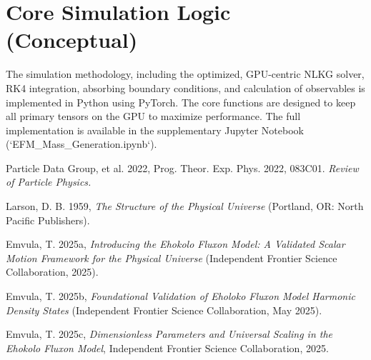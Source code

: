 \documentclass[11pt]{article}
\begin{document}
\appendix
\section{Core Simulation Logic (Conceptual)}
\label{app:code_mass_gen_final}
The simulation methodology, including the optimized, GPU-centric NLKG solver, RK4 integration, absorbing boundary conditions, and calculation of observables is implemented in Python using PyTorch. The core functions are designed to keep all primary tensors on the GPU to maximize performance. The full implementation is available in the supplementary Jupyter Notebook (`EFM_Mass_Generation.ipynb`).

 
\begin{thebibliography}{99}
\raggedright
{}
Particle Data Group, et al. 2022, Prog. Theor. Exp. Phys. 2022, 083C01. 
\textit{Review of Particle Physics.}

Larson, D. B. 1959, \textit{The Structure of the Physical Universe} (Portland, OR: North Pacific Publishers).

Emvula, T. 2025a, \textit{Introducing the Ehokolo Fluxon Model: A Validated Scalar Motion Framework for the Physical Universe} (Independent Frontier Science Collaboration, 2025). 

Emvula, T. 2025b, \textit{Foundational Validation of Eholoko Fluxon Model Harmonic Density States} (Independent Frontier Science Collaboration, May 2025).

Emvula, T. 2025c, \textit{Dimensionless Parameters and Universal Scaling in the Ehokolo Fluxon Model}, Independent Frontier Science Collaboration, 2025.

\end{thebibliography}
\end{document}
